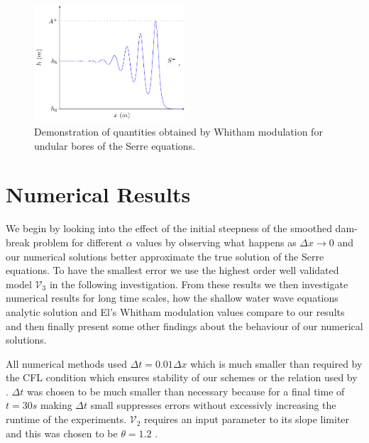 \documentclass[times]{elsarticle}
\begin{document}
\begin{figure}
\centering
\includegraphics[width=0.5\textwidth]{pics/explainers/SERREex.pdf}
\caption{Demonstration of quantities obtained by Whitham modulation for undular bores of the Serre equations.}
\label{fig:Serreanadiagram}
\end{figure}



\section{Numerical Results}
\label{section:NumRes}
We begin by looking into the effect of the initial steepness of the smoothed dam-break problem for different $\alpha$ values by observing what happens as $\Delta x \rightarrow 0$ and our numerical solutions better approximate the true solution of the Serre equations. To have the smallest error we use the highest order well validated model $\mathcal{V}_3$ in the following investigation. From these results we then investigate numerical results for long time scales, how the shallow water wave equations analytic solution and El's Whitham modulation values compare to our results and then finally present some other findings about the behaviour of our numerical solutions. 

All numerical methods used $\Delta t = 0.01 \Delta x$ which is much smaller than required by the CFL condition \cite{Harten-etal-1983-357} which ensures stability of our schemes or the relation used by \cite{El-etal-2006}. $\Delta t$ was chosen to be much smaller than necessary because for a final time of $t=30s$ making $\Delta t$ small suppresses errors without excessivly increasing the runtime of the experiments. $\mathcal{V}_2$ requires an input parameter to its slope limiter and this was chosen to be $\theta = 1.2$ \cite{Zoppou-etal-2017}. 
\end{document}
